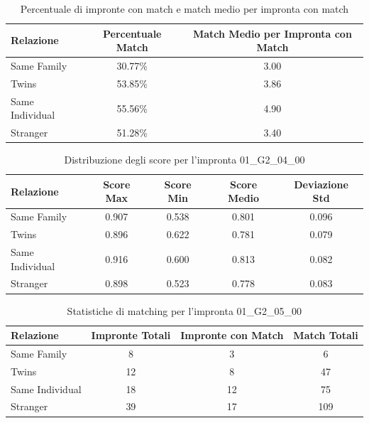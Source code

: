 \begin{table}[htbp]
\centering
\caption{Percentuale di impronte con match e match medio per impronta con match}
\label{tab:match_percentage_01_G2_04_00}
\begin{tabular}{|l|c|c|}
\hline
\textbf{Relazione} & \textbf{Percentuale Match} & \textbf{Match Medio per Impronta con Match} \\
\hline
Same Family & 30.77\% & 3.00 \\
\hline
Twins & 53.85\% & 3.86 \\
\hline
Same Individual & 55.56\% & 4.90 \\
\hline
Stranger & 51.28\% & 3.40 \\
\hline
\end{tabular}
\end{table}


\begin{table}[htbp]
\centering
\caption{Distribuzione degli score per l'impronta 01\_G2\_04\_00}
\label{tab:scores_01_G2_04_00}
\begin{tabular}{|l|c|c|c|c|}
\hline
\textbf{Relazione} & \textbf{Score Max} & \textbf{Score Min} & \textbf{Score Medio} & \textbf{Deviazione Std} \\
\hline
Same Family & 0.907 & 0.538 & 0.801 & 0.096 \\
\hline
Twins & 0.896 & 0.622 & 0.781 & 0.079 \\
\hline
Same Individual & 0.916 & 0.600 & 0.813 & 0.082 \\
\hline
Stranger & 0.898 & 0.523 & 0.778 & 0.083 \\
\hline
\end{tabular}
\end{table}


\begin{table}[htbp]
\centering
\caption{Statistiche di matching per l'impronta 01\_G2\_05\_00}
\label{tab:results_01_G2_05_00}
\begin{tabular}{|l|c|c|c|}
\hline
\textbf{Relazione} & \textbf{Impronte Totali} & \textbf{Impronte con Match} & \textbf{Match Totali} \\
\hline
Same Family & 8 & 3 & 6 \\
\hline
Twins & 12 & 8 & 47 \\
\hline
Same Individual & 18 & 12 & 75 \\
\hline
Stranger & 39 & 17 & 109 \\
\hline
\end{tabular}
\end{table}


